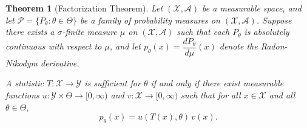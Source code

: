 \documentclass{article}
\newtheorem{theorem}{Theorem}
\begin{document}
\begin{theorem}[Factorization Theorem]
Let $(\mathcal{X}, \mathcal{A})$ be a measurable space, and let $\mathcal{P} = \{P_\theta : \theta \in \Theta\}$ be a family of probability measures on $(\mathcal{X}, \mathcal{A})$. Suppose there exists a $\sigma$-finite measure $\mu$ on $(\mathcal{X}, \mathcal{A})$ such that each $P_\theta$ is absolutely continuous with respect to $\mu$, and let $p_\theta(x) = \dfrac{dP_\theta}{d\mu}(x)$ denote the Radon-Nikodym derivative.

A statistic $T: \mathcal{X} \to \mathcal{Y}$ is sufficient for $\theta$ if and only if there exist measurable functions $u: \mathcal{Y} \times \Theta \to [0, \infty)$ and $v: \mathcal{X} \to [0, \infty)$ such that for all $x \in \mathcal{X}$ and all $\theta \in \Theta$,
\[
p_\theta(x) = u(T(x), \theta) \, v(x).
\]
\end{theorem}
\end{document}

